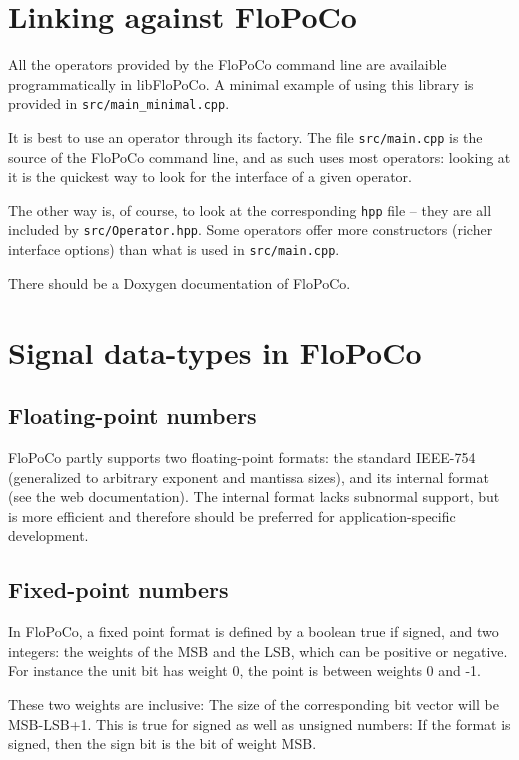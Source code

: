 \documentclass{article}
\begin{document}
\section{Linking against FloPoCo\label{sec:linking}}
All the operators provided by the FloPoCo command line are availaible
programmatically in libFloPoCo. A minimal example of using this
library is provided in \texttt{src/main\_minimal.cpp}.

It is best to use an operator through its factory. The file \texttt{src/main.cpp} is the source of the FloPoCo command
line, and as such uses most operators: looking at it is the quickest
way to look for the interface of a given operator.

The other way is, of course, to look at the corresponding \texttt{hpp}
file -- they are all included by \texttt{src/Operator.hpp}. Some
operators offer more constructors (richer interface options) than what
is used in \texttt{src/main.cpp}.


There should be a Doxygen documentation of FloPoCo.

\section{Signal data-types in FloPoCo}

\subsection{Floating-point numbers}

FloPoCo partly supports two floating-point formats: the standard IEEE-754 (generalized to arbitrary exponent and mantissa sizes), and its internal format (see the web documentation).
The internal format lacks subnormal support, but is more efficient and therefore should be preferred for application-specific development.


\subsection{Fixed-point numbers}
In FloPoCo, a fixed point format is defined by a boolean true if signed, and two integers: the weights of the MSB and the LSB, which can be positive or negative. 
For instance the unit bit has weight 0, the point is between weights 0 and -1. 

These two weights are inclusive: The size of the corresponding bit vector will be MSB-LSB+1.
This is true for signed as well as unsigned numbers: If the format is signed, then the sign bit is the bit of weight MSB.
\end{document}
